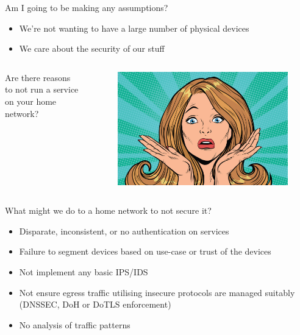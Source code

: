 \documentclass{beamer}
\begin{document}
\begin{frame}
    Am I going to be making any assumptions?
    \begin{itemize}
        \item We're not wanting to have a large number of physical devices 
        \item We care about the security of our stuff
    \end{itemize}
\end{frame}

\begin{frame}
    \begin{columns}
        \begin{column}{0.5\textwidth}
            Are there reasons to not run a service on your home network?
        \end{column}
        \begin{column}{0.5\textwidth}
            \begin{figure}
                \centering
                \includegraphics[width=\textwidth,keepaspectratio]{../resources/confusion.jpg}
            \end{figure}
        \end{column}
    \end{columns}
\end{frame}

\begin{frame}
    \begin{center}
        What might we do to a home network to not secure it?
    \end{center}
\end{frame}

\begin{frame}
    \begin{itemize}
        \item Disparate, inconsistent, or no authentication on services
        \item Failure to segment devices based on use-case or trust of the devices
        \item Not implement any basic IPS/IDS
        \item Not ensure egress traffic utilising insecure protocols are managed suitably (DNSSEC, DoH or DoTLS enforcement)
        \item No analysis of traffic patterns
    \end{itemize}
\end{frame}
\end{document}
